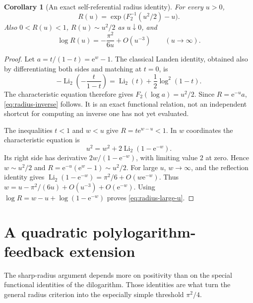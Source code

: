 \documentclass[11pt,a4paper]{article}
\newtheorem{corollary}[theorem]{Corollary}
\theoremstyle{definition}\newtheorem{definition}[theorem]{Definition}
\theoremstyle{remark}\newtheorem{remark}[theorem]{Remark}
\newcommand{\Li}{\operatorname{Li}}
\newcommand{\ee}{\mathrm e}
\numberwithin{equation}{section}
\begin{document}
\begin{corollary}[An exact self-referential radius identity]\label{cor:radius-inverse}
For every $u>0$,
\begin{equation}\label{eq:radius-inverse}
 R(u)=\exp\bigl(F_2^{-1}(u^2/2)-u\bigr).
\end{equation}
Also $0<R(u)<1$, $R(u)\sim u^2/2$ as $u\downarrow0$, and
\begin{equation}\label{eq:radius-large-u}
 \log R(u)=-\frac{\pi^2}{6u}+O(u^{-3})\qquad(u\to\infty).
\end{equation}
\end{corollary}
\begin{proof}
Let $a=t/(1-t)=\ee^w-1$. The classical Landen identity, obtained also by
differentiating both sides and matching at $t=0$, is
\[
 -\Li_2\!\left(-\frac{t}{1-t}\right)
     =\Li_2(t)+\frac12\log^2(1-t).
\]
The characteristic equation therefore gives $F_2(\log a)=u^2/2$.
Since $R=\ee^{-u}a$, \eqref{eq:radius-inverse} follows.
It is an exact functional relation, not an independent shortcut for
computing an inverse one has not yet evaluated.

The inequalities $t<1$ and $w<u$ give $R=t\ee^{w-u}<1$.
In $w$ coordinates the characteristic equation is
\begin{equation}\label{eq:characteristic-w}
 u^2=w^2+2\Li_2(1-\ee^{-w}).
\end{equation}
Its right side has derivative $2w/(1-\ee^{-w})$, with limiting value $2$
at zero. Hence $w\sim u^2/2$ and $R=\ee^{-u}(\ee^w-1)\sim u^2/2$.
For large $u$, $w\to\infty$, and the reflection identity gives
$\Li_2(1-\ee^{-w})=\pi^2/6+O(w\ee^{-w})$.
Thus
$w=u-\pi^2/(6u)+O(u^{-3})+O(\ee^{-w})$.
Using $\log R=w-u+\log(1-\ee^{-w})$ proves
\eqref{eq:radius-large-u}.
\end{proof}

\section{A quadratic polylogarithm-feedback extension}\label{sec:feedback}

The sharp-radius argument depends more on positivity than on the special
functional identities of the dilogarithm. Those identities are what turn
the general radius criterion into the especially simple threshold
$\pi^2/4$.
\end{document}
